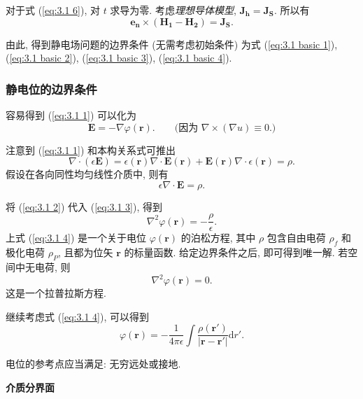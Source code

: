 对于式 (\ref{eq:3.1 6}), 对 $t$ 求导为零. 考虑\textit{理想导体模型}, $\bm{J_h}=\bm{J_S}$. 所以有
\begin{equation} \label{eq:3.1 basic 4}
    \bm{e_n}\times(\bm{H_1}-\bm{H_2})=\bm{J_S}.
\end{equation}

由此, 得到静电场问题的边界条件 (无需考虑初始条件) 为式 (\ref{eq:3.1 basic 1}), (\ref{eq:3.1 basic 2}), (\ref{eq:3.1 basic 3}), (\ref{eq:3.1 basic 4}).

\subsubsection{静电位的边界条件} \label{3.1.2}
容易得到 (\ref{eq:3.1 1}) 可以化为
\begin{equation} \label{eq:3.1 2}
    \bm{E}=-\nabla\varphi(\bm{r}). \qquad \text{(因为 $\nabla\times(\nabla u)\equiv 0$.)}
\end{equation}

注意到 (\ref{eq:3.1 1}) 和本构关系式可推出
\begin{equation}
    \nabla\cdot(\epsilon\bm{E})=\epsilon(\bm{r})\nabla\cdot\bm{E}(\bm{r})+\bm{E}(\bm{r})\nabla\cdot\epsilon(\bm{r})=\rho.
\end{equation}
假设在各向同性均匀线性介质中, 则有
\begin{equation} \label{eq:3.1 3}
    \epsilon\nabla\cdot\bm{E}=\rho.
\end{equation}

将 (\ref{eq:3.1 2}) 代入 (\ref{eq:3.1 3}), 得到
\begin{equation} \label{eq:3.1 4}
    \nabla^2\varphi(\bm{r})=-\frac{\rho}{\epsilon}.
\end{equation}
上式 (\ref{eq:3.1 4}) 是一个关于电位 $\varphi(\bm{r})$ 的泊松方程, 其中 $\rho$ 包含自由电荷 $\rho_f$ 和极化电荷 $\rho_P$, 且都为位矢 $\bm{r}$ 的标量函数. 给定边界条件之后, 即可得到唯一解. 若空间中无电荷, 则
\begin{equation}
    \nabla^2\varphi(\bm{r})=0.
\end{equation}
这是一个拉普拉斯方程.

继续考虑式 (\ref{eq:3.1 4}), 可以得到
\begin{equation}
    \varphi(\bm{r})=-\frac{1}{4\pi\epsilon}\int\frac{\rho(\bm{r'})}{|\bm{r}-\bm{r'}|}\mathrm{d}r'.
\end{equation}

电位的参考点应当满足: 无穷远处或接地.

\textbf{介质分界面}

